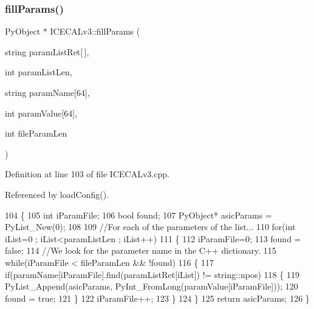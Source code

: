 \subsubsection{\texorpdfstring{fill\+Params()}{fillParams()}}
{\footnotesize\ttfamily Py\+Object $\ast$ I\+C\+E\+C\+A\+Lv3\+::fill\+Params (\begin{DoxyParamCaption}\item[{string}]{param\+List\+Ret\mbox{[}$\,$\mbox{]},  }\item[{int}]{param\+List\+Len,  }\item[{string}]{param\+Name\mbox{[}64\mbox{]},  }\item[{int}]{param\+Value\mbox{[}64\mbox{]},  }\item[{int}]{file\+Param\+Len }\end{DoxyParamCaption})\hspace{0.3cm}{\ttfamily [private]}}



Definition at line 103 of file I\+C\+E\+C\+A\+Lv3.\+cpp.



Referenced by load\+Config().


\begin{DoxyCode}
104 \{
105     \textcolor{keywordtype}{int} iParamFile;
106     \textcolor{keywordtype}{bool} found;
107     PyObject* asicParams = PyList\_New(0);
108 
109     \textcolor{comment}{//For each of the parameters of the list...}
110     \textcolor{keywordflow}{for}(\textcolor{keywordtype}{int} iList=0 ; iList<paramListLen ; iList++)
111     \{
112         iParamFile=0;
113         found = \textcolor{keyword}{false};
114         \textcolor{comment}{//We look for the parameter name in the C++ dictionary.}
115         \textcolor{keywordflow}{while}(iParamFile < fileParamLen && !found)
116         \{
117             \textcolor{keywordflow}{if}(paramName[iParamFile].find(paramListRet[iList]) != string::npos)
118             \{
119                 PyList\_Append(asicParams, PyInt\_FromLong(paramValue[iParamFile]));
120                 found = \textcolor{keyword}{true};
121             \}
122             iParamFile++;
123         \}
124     \}
125     \textcolor{keywordflow}{return} asicParams;
126 \}
\end{DoxyCode}
\mbox{\label{classICECALv3_a5f1414e6049a82eafdd505a88d7d0c91}} 
